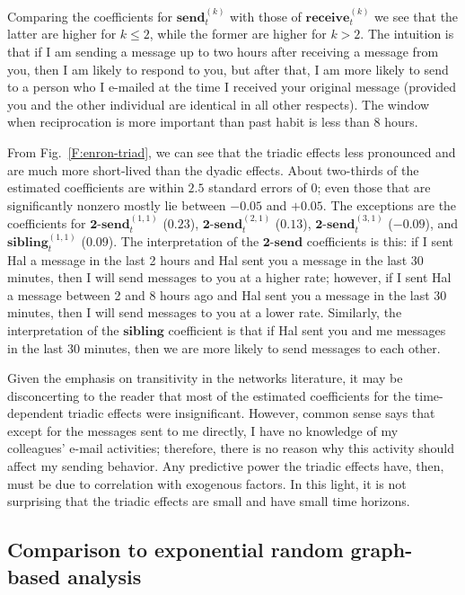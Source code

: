 \documentclass[final]{statsoc}
\begin{document}
Comparing the coefficients for $\textbf{send}_t^{(k)}$ with those of
$\textbf{receive}_t^{(k)}$ we see that the latter are higher for $k \leq 2$,
while the former are higher for $k > 2$.  The intuition is that if I am
sending a message up to two hours after receiving a message from you, then I
am likely to respond to you, but after that, I am more likely to send to a
person who I e-mailed at the time I received your original message (provided
you and the other individual are identical in all other respects).  The window
when reciprocation is more important than past habit is less than 8 hours.

From Fig.~\ref{F:enron-triad}, we can see that the triadic effects less
pronounced and are much more short-lived than the dyadic effects.  About
two-thirds of the estimated coefficients are within $2.5$ standard errors of
$0$; even those that are significantly nonzero mostly lie between $-0.05$ and
$+0.05$.  The exceptions are the coefficients for
$\textbf{2-send}_t^{(1,1)}$ ($0.23$),
$\textbf{2-send}_t^{(2,1)}$ ($0.13$),
$\textbf{2-send}_t^{(3,1)}$ ($-0.09$),
and
$\textbf{sibling}_t^{(1,1)}$ ($0.09$).  The interpretation of the
$\textbf{2-send}$ coefficients is this: if I sent Hal a message in the last 2
hours and Hal sent you a message in the last 30 minutes, then I will send
messages to you at a higher rate; however, if I sent Hal a message between 2
and 8 hours ago and Hal sent you a message in the last 30 minutes, then I will
send messages to you at a lower rate.  Similarly, the interpretation of the
$\textbf{sibling}$ coefficient is that if Hal sent you and me messages in the
last 30 minutes, then we are more likely to send messages to each other.

Given the emphasis on transitivity in the networks literature, it may be
disconcerting to the reader that most of the estimated coefficients for the
time-dependent triadic effects were insignificant.  However,
common sense says that except for the messages sent to me directly, I have
no knowledge of my colleagues' e-mail activities; therefore, there is no
reason why this activity should affect my sending behavior.  Any predictive
power the triadic effects have, then, must be due to correlation with
exogenous factors.  In this light, it is not surprising that the triadic
effects are small and have small time horizons.

\subsection{Comparison to exponential random graph-based analysis}
\end{document}

